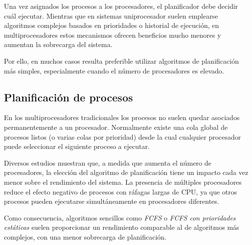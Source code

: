 Una vez asignados los procesos a los procesadores, el planificador debe decidir cuál ejecutar. Mientras que en sistemas uniprocesador suelen emplearse algoritmos complejos basados en prioridades o historial de ejecución, en multiprocesadores estos mecanismos ofrecen beneficios mucho menores y aumentan la sobrecarga del sistema.

Por ello, en muchos casos resulta preferible utilizar algoritmos de planificación más simples, especialmente cuando el número de procesadores es elevado.

\subsection{Planificación de procesos}

En los multiprocesadores tradicionales los procesos no suelen quedar asociados permanentemente a un procesador. Normalmente existe una cola global de procesos listos (o varias colas por prioridad) desde la cual cualquier procesador puede seleccionar el siguiente proceso a ejecutar.

Diversos estudios muestran que, a medida que aumenta el número de procesadores, la elección del algoritmo de planificación tiene un impacto cada vez menor sobre el rendimiento del sistema. La presencia de múltiples procesadores reduce el efecto negativo de procesos con ráfagas largas de CPU, ya que otros procesos pueden ejecutarse simultáneamente en procesadores diferentes.

Como consecuencia, algoritmos sencillos como \textit{FCFS} o \textit{FCFS con prioridades estáticas} suelen proporcionar un rendimiento comparable al de algoritmos más complejos, con una menor sobrecarga de planificación.

